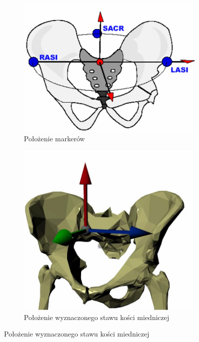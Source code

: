 \begin{savenotes}
	\begin{figure}[!htb]
		\captionsetup{singlelinecheck=off}
		\centering
		\begin{subfigure}[b]{0.45\textwidth}
			\centering
			\includegraphics[width=\linewidth]{images/pelvisEstimationA.jpg}	
			\caption{Położenie markerów}
			\label{fig:literature:vicon:pelvisPlacementA}
		\end{subfigure}
																										
		\begin{subfigure}[b]{0.45\textwidth}
			\centering
			\includegraphics[width=\linewidth]{images/pelvisEstimationB.jpg}		
			\caption{Położenie wyznaczonego stawu kości miedniczej}
			\label{fig:literature:vicon:pelvisPlacementB}
		\end{subfigure}
																									

\end{figure}
\end{savenotes}
